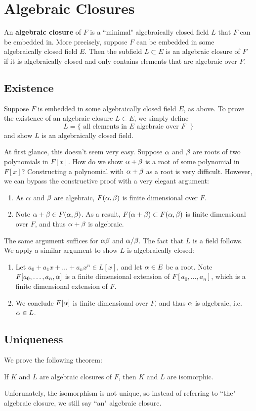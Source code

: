 \section{Algebraic Closures}
An \textbf{algebraic closure} of $F$ is a ``minimal" algebraically closed field $L$ that $F$ can be embedded in. More precisely, suppose $F$ can be embedded in some algebraically closed field $E$. Then the subfield $L \subset E$ is an algebraic closure of $F$ if it is algebraically closed and only contains elements that are algebraic over $F$.

\subsection{Existence}
Suppose $F$ is embedded in some algebraically closed field $E$, as above. To prove the existence of an algebraic closure $L \subset E$, we simply define
\[
    L = \{\text{ all elements in $E$ algebraic over $F$ }\}
\]
and show $L$ is an algebraically closed field.

At first glance, this doesn't seem very easy. Suppose $\alpha$ and $\beta$ are roots of two polynomials in $F[x]$. How do we show $\alpha + \beta$ is a root of some polynomial in $F[x]$? Constructing a polynomial with $\alpha + \beta$ as a root is very difficult. However, we can bypass the constructive proof with a very elegant argument:
\begin{enumerate}
    \item As $\alpha$ and $\beta$ are algebraic, $F(\alpha, \beta)$ is finite dimensional over $F$.
    \item Note $\alpha + \beta \in F(\alpha, \beta)$. As a result, $F(\alpha + \beta) \subset F(\alpha, \beta)$ is finite dimensional over $F$, and thus $\alpha + \beta$ is algebraic.
\end{enumerate}
The same argument suffices for $\alpha\beta$ and $\alpha/\beta$. The fact that $L$ is a field follows. We apply a similar argument to show $L$ is algebraically closed:
\begin{enumerate}
    \item Let $a_0 + a_1x + \dots + a_nx^n \in L[x]$, and let $\alpha \in E$ be a root. Note $F[a_0, \dots, a_n, \alpha]$ is a finite dimensional extension of $F[a_0, \dots, a_n]$, which is a finite dimensional extension of $F$.
    \item We conclude $F[\alpha]$ is finite dimensional over $F$, and thus $\alpha$ is algebraic, i.e. $\alpha \in L$.
\end{enumerate}

\subsection{Uniqueness}
We prove the following theorem:
\begin{center}
    If $K$ and $L$ are algebraic closures of $F$, then $K$ and $L$ are isomorphic.
\end{center}
Unforunately, the isomorphism is not unique, so instead of referring to ``the" algebraic closure, we still say ``an" algebraic closure.

